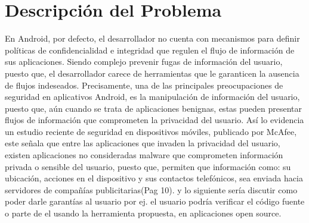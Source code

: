 \label{ch:problema}
\chapter{Descripción del Problema}
En Android, por defecto, el desarrollador no cuenta con mecanismos para definir
políticas de confidencialidad e integridad que regulen el flujo de información
de sus aplicaciones. Siendo complejo prevenir fugas de información del usuario,
puesto que, el desarrollador carece de herramientas que le garanticen la
ausencia de flujos indeseados. \newline
Precisamente, una de las principales preocupaciones de seguridad en aplicativos
Android, es la manipulación de información del usuario, puesto que, aún cuando
se trata de aplicaciones benignas, estas pueden presentar flujos de información
que comprometen la privacidad del usuario. \newline
Así lo evidencia un estudio reciente de seguridad en dispositivos móviles,
publicado por McAfee\cite{McAfeeReport}, este señala que entre las aplicaciones
que invaden la privacidad del usuario, existen aplicaciones no consideradas
malware que comprometen información privada o sensible del usuario,
puesto que, permiten que información como: su ubicación,
acciones en el dispositivo y sus contactos telefónicos, sea enviada hacia
servidores de compañías publicitarias\cite{McAfeeReport}(Pag 10).\newline
y lo siguiente sería discutir como poder darle garantías al usuario \newline
por ej. el usuario podría verificar el código fuente o parte de el usando la
herramienta propuesta, en aplicaciones open source.
% 
% 
